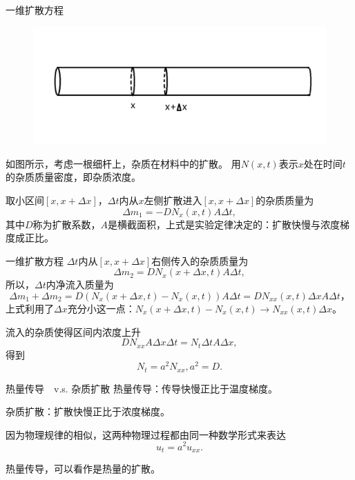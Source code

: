 \documentclass[11pt]{beamer}
\newcommand{\kong}[1][0.5]{\vspace{#1cm}}
\begin{document}
\begin{frame}{一维扩散方程}
\begin{figure}
\centering
\includegraphics[width=0.7\linewidth]{chap8扩散方程}
\end{figure}
如图所示，考虑一根细杆上，杂质在材料中的扩散。
用$N(x,t)$表示$x$处在时间$t$的杂质质量密度，即杂质浓度。

取小区间$[x,x+\Delta x]$，$\Delta t$内从$x$左侧扩散进入$[x,x+\Delta x]$的杂质质量为
\begin{equation}
\Delta m_1 = - D N_x(x,t) A \Delta t,
\end{equation}
其中$D$称为扩散系数，$A$是横截面积，上式是实验定律决定的：扩散快慢与浓度梯度成正比。
\end{frame}

\begin{frame}{一维扩散方程}
$\Delta t$内从$[x,x+\Delta x]$右侧传入的杂质质量为
\begin{equation}
\Delta m_2 = D N_x(x+\Delta x, t) A \Delta t,
\end{equation}
所以，$\Delta t$内净流入质量为
\begin{equation}
\Delta m_1 + \Delta m_2 = D( N_x(x+\Delta x, t) - N_x(x,t) ) A \Delta t
= D N_{xx}(x,t) \Delta x A \Delta t，
\end{equation}
上式利用了$\Delta x$充分小这一点：$N_x(x+\Delta x, t) - N_x(x,t) \rightarrow N_{xx}(x,t) \Delta x$。

流入的杂质使得区间内浓度上升
\begin{equation}
D N_{xx} A \Delta x \Delta t = N_t \Delta t A \Delta x,
\end{equation}
得到
\begin{equation}
N_t = a^2 N_{xx}, a^2 = D.
\end{equation}
\end{frame}

\begin{frame}{热量传导　v.s. 杂质扩散}
热量传导：传导快慢正比于温度梯度。

\kong[0.3]
杂质扩散：扩散快慢正比于浓度梯度。

\kong[0.3]
因为物理规律的相似，这两种物理过程都由同一种数学形式来表达
\begin{equation}
u_t = a^2 u_{xx}.
\end{equation}

\kong[0.3]
热量传导，可以看作是热量的扩散。
\end{frame}
\end{document}
